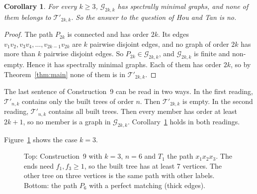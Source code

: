 \documentclass[11pt]{article}
\newtheorem{corollary}[theorem]{Corollary}
\theoremstyle{definition}
\newcommand{\G}{\mathcal{G}}
\newcommand{\Tp}{\mathcal{T}'}
\begin{document}
\begin{corollary}\label{cor:answer}
For every $k \ge 3$, $\G_{2k,k}$ has spectrally minimal graphs, and none of them belongs
to $\Tp_{2k,k}$. So the answer to the question of Hou and Tan is no.
\end{corollary}

\begin{proof}
The path $P_{2k}$ is connected and has order $2k$. Its edges $v_1v_2, v_3v_4, \dots,
v_{2k-1}v_{2k}$ are $k$ pairwise disjoint edges, and no graph of order $2k$ has more than
$k$ pairwise disjoint edges. So $P_{2k} \in \G_{2k,k}$, and $\G_{2k,k}$ is finite and
non-empty. Hence it has spectrally minimal graphs. Each of them has order $2k$, so by
Theorem~\ref{thm:main} none of them is in $\Tp_{2k,k}$.
\end{proof}

The last sentence of Construction~9 can be read in two ways. In the first reading,
$\Tp_{n,k}$ contains only the built trees of order $n$. Then $\Tp_{2k,k}$ is empty. In the
second reading, $\Tp_{n,k}$ contains all built trees. Then every member has order at least
$2k+1$, so no member is a graph in $\G_{2k,k}$. Corollary~\ref{cor:answer} holds in both
readings.

Figure~\ref{fig:example} shows the case $k = 3$.

\begin{figure}[ht]
\centering
{}
\caption{Top: Construction~9 with $k=3$, $n=6$ and $T_1$ the path $x_1x_2x_3$. The ends
need $f_1, f_3 \ge 1$, so the built tree has at least 7 vertices. The other tree on three
vertices is the same path with other labels. Bottom: the path $P_6$ with a perfect
matching (thick edges).}
\label{fig:example}
\end{figure}
\end{document}
